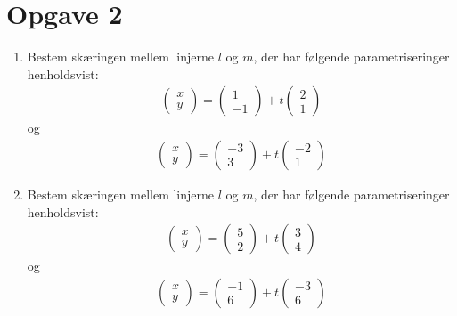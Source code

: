 \section*{Opgave 2}
\begin{enumerate}[label=\roman*)]

\item Bestem skæringen mellem linjerne $l$ og $m$, der har følgende parametriseringer henholdsvist:
\begin{align*}
\begin{pmatrix}
x \\ y
\end{pmatrix}
= 
\begin{pmatrix}
1 \\ -1
\end{pmatrix}
+
t
\begin{pmatrix}
2 \\ 1
\end{pmatrix}
\end{align*}
og 
\begin{align*}
\begin{pmatrix}
x \\ y
\end{pmatrix}
= 
\begin{pmatrix}
-3 \\ 3
\end{pmatrix}
+
t
\begin{pmatrix}
-2 \\ 1
\end{pmatrix}
\end{align*}

\item Bestem skæringen mellem linjerne $l$ og $m$, der har følgende parametriseringer henholdsvist:
\begin{align*}
\begin{pmatrix}
x \\ y
\end{pmatrix}
= 
\begin{pmatrix}
5 \\ 2
\end{pmatrix}
+
t
\begin{pmatrix}
3 \\ 4
\end{pmatrix}
\end{align*}
og 
\begin{align*}
\begin{pmatrix}
x \\ y
\end{pmatrix}
= 
\begin{pmatrix}
-1 \\ 6
\end{pmatrix}
+
t
\begin{pmatrix}
-3 \\ 6
\end{pmatrix}
\end{align*}

\end{enumerate}

